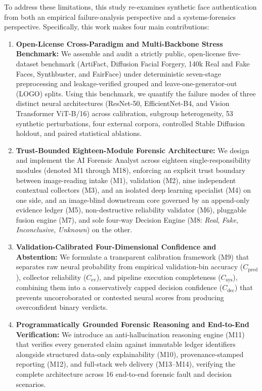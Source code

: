 \documentclass[final,5p,times,twocolumn,numafflabel]{elsarticle}
\begin{document}
To address these limitations, this study re-examines synthetic face authentication from both an empirical failure-analysis perspective and a systems-forensics perspective. Specifically, this work makes four main contributions:

\begin{enumerate}
  \item \textbf{Open-License Cross-Paradigm and Multi-Backbone Stress Benchmark:} We assemble and audit a strictly public, open-license five-dataset benchmark (ArtiFact, Diffusion Facial Forgery, 140k Real and Fake Faces, Synthbuster, and FairFace) under deterministic seven-stage preprocessing and leakage-verified grouped and leave-one-generator-out (LOGO) splits. Using this benchmark, we quantify the failure modes of three distinct neural architectures (ResNet-50, EfficientNet-B4, and Vision Transformer ViT-B/16) across calibration, subgroup heterogeneity, 53 synthetic perturbations, four external corpora, controlled Stable Diffusion holdout, and paired statistical ablations.
  \item \textbf{Trust-Bounded Eighteen-Module Forensic Architecture:} We design and implement the AI Forensic Analyst across eighteen single-responsibility modules (denoted M1 through M18), enforcing an explicit trust boundary between image-reading intake (M1), validation (M2), nine independent contextual collectors (M3), and an isolated deep learning specialist (M4) on one side, and an image-blind downstream core governed by an append-only evidence ledger (M5), non-destructive reliability validator (M6), pluggable fusion engine (M7), and sole four-way Decision Engine (M8: \textit{Real}, \textit{Fake}, \textit{Inconclusive}, \textit{Unknown}) on the other.
  \item \textbf{Validation-Calibrated Four-Dimensional Confidence and Abstention:} We formulate a transparent calibration framework (M9) that separates raw neural probability from empirical validation-bin accuracy ($C_{\text{pred}}$), collector reliability ($C_{\text{ev}}$), and pipeline execution completeness ($C_{\text{sys}}$), combining them into a conservatively capped decision confidence ($C_{\text{dec}}$) that prevents uncorroborated or contested neural scores from producing overconfident binary verdicts.
  \item \textbf{Programmatically Grounded Forensic Reasoning and End-to-End Verification:} We introduce an anti-hallucination reasoning engine (M11) that verifies every generated claim against immutable ledger identifiers alongside structured data-only explainability (M10), provenance-stamped reporting (M12), and full-stack web delivery (M13--M14), verifying the complete architecture across 16 end-to-end forensic fault and decision scenarios.
\end{enumerate}
\end{document}
